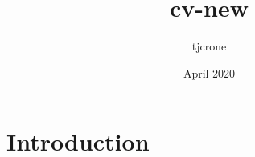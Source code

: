 \documentclass{article}
\title{cv-new}
\author{tjcrone }
\date{April 2020}
\begin{document}
\maketitle

\section{Introduction}
\end{document}
